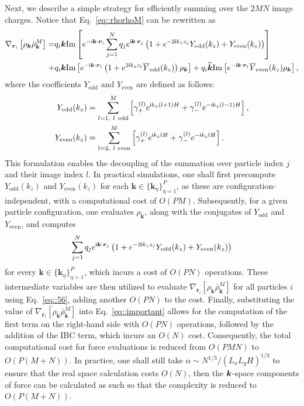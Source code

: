 Next, we describe a simple strategy for efficiently summing over the $2MN$ image charges.
Notice that Eq.~\eqref{eq::rhorhoM} can be rewritten as
\begin{equation}\label{eq::56}
\begin{split}
    \nabla_{\bm{r}_i}\left[\rho_{\bm{k}}\bar{\rho}_{\bm{k}}^{M}\right]
    = & q_i\bm{k}\text{Im}\left[e^{-\mathsf i \bm{k}\cdot \bm{r}_i}\sum_{j=1}^{N}q_je^{\mathsf i\bm{k}\cdot\bm{r}_{j}}\left(1+e^{-2\mathsf i k_zz_j}Y_{\text{odd}}(k_z)+Y_{\text{even}}(k_z)\right)\right]\\
    + & q_i\bm{k}\text{Im}\left[e^{-\mathsf i \bm{k}\cdot\bm{r}_i}\left(1+e^{2\mathsf i k_zz_i}\overline{Y}_{\text{odd}}(k_z)\right)\rho_{\bm{k}}\right]+q_{i}\widehat{\bm{k}}\text{Im}\left[e^{-\mathsf i\bm{k}\cdot\bm{r}_i}\overline{Y}_{\text{even}}(k_z)\rho_{\bm{k}}\right],
\end{split}
\end{equation}
 {where the coefficients $Y_{\text{odd}}$ and $Y_{\text{even}}$ are defined as follows: 
\begin{equation}
    \begin{split}
        Y_{\text{odd}}(k_z) &= \sum_{\substack{l=1,\ l\ \text{odd}}}^{M}\left[\gamma_{+}^{(l)}e^{\i k_z(l+1) H}+\gamma_{-}^{(l)}e^{-\i k_z (l-1)H}\right], \\ 
        Y_{\text{even}}(k_z) &= \sum_{\substack{l=2,\ l\ \text{even}}}^{M}\left[\gamma_{+}^{(l)}e^{\i k_zl H}+\gamma_{-}^{(l)}e^{-\i k_z l H}\right].
    \end{split}
\end{equation}
This formulation enables the decoupling of the summation over particle index $j$ and their image index $l$. 
In practical simulations, one shall first precompute $Y_{\text{odd}}(k_z)$ and $Y_{\text{even}}(k_z)$ for each $\bm{k} \in \{\bm{k}_{\eta}\}_{\eta=1}^{P}$, as these are configuration-independent, with a computational cost of $O(PM)$. 
Subsequently, for a given particle configuration, one evaluates $\rho_{\bm{k}}$, along with the conjugates of $Y_{\text{odd}}$ and $Y_{\text{even}}$, and computes
\begin{equation}
    \sum_{j=1}^{N}q_je^{\mathsf i\bm{k}\cdot\bm{r}_{j}}\left(1+e^{-2\mathsf i k_zz_j}Y_{\text{odd}}(k_z)+Y_{\text{even}}(k_z)\right)
\end{equation}
for every $\bm{k}\in\{\bm{k}_{\eta}\}_{\eta=1}^{P}$, which incurs a cost of $O(PN)$ operations. These intermediate variables are then utilized to evaluate $\nabla_{\bm{r}_i}\left[\rho_{\bm{k}}\bar{\rho}_{\bm{k}}^{M}\right]$ for all particles $i$ using Eq.~\eqref{eq::56}, adding another $O(PN)$ to the cost. Finally, substituting the value of $\nabla_{\bm{r}_i}\left[\rho_{\bm{k}}\bar{\rho}_{\bm{k}}^{M}\right]$ into Eq.~\eqref{eq::important} allows for the computation of the first term on the right-hand side with $O(PN)$ operations, followed by the addition of the IBC term, which incurs an $O(N)$ cost. Consequently, the total computational cost for force evaluations is reduced from $O(PMN)$ to $O(P(M+N))$.
In practice, one shall still take $\alpha \sim N^{1/3}/(L_xL_yH)^{1/3}$ to ensure that the real space calculation costs $O(N)$, then the $\boldsymbol{k}$-space components of force can be calculated as such so that the complexity is reduced to $O(P(M+N))$.}
